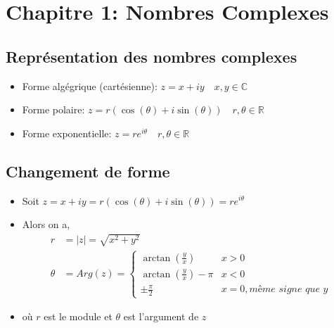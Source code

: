 \section*{Chapitre 1: Nombres Complexes}

\subsection*{Représentation des nombres complexes}
\begin{itemize}[itemsep = 0.5em]
    \item[] Forme algégrique (cartésienne): \begin{math}z = x + iy \quad x,y \in \mathbb{C} \end{math}
    \item[] Forme polaire: $z = r(\cos(\theta)+i\sin(\theta)) \quad r, \theta \in \mathbb{R}$
    \item[] Forme exponentielle: \(z = re^{i\theta} \quad r, \theta \in \mathbb{R} \)
  \end{itemize}


\subsection*{Changement de forme}
\begin{itemize}
    \item[] Soit $z = x + iy = r(\cos(\theta)+i\sin(\theta)) = re^{i\theta}$
    \item[] Alors on a,
    \begin{align*}
    r &= |z| = \sqrt{x^2 + y^2} \\
    \theta &= Arg(z) =
    \begin{cases} 
        \arctan(\frac{y}{x}) & x > 0 \\
        \arctan(\frac{y}{x}) - \pi & x < 0 \\
        \pm\frac{\pi}{2} & x = 0, \textit{même signe que y}
    \end{cases}
    \end{align*}
    \item[] où $r$ est le module et $\theta$ est l'argument de $z$ 
\end{itemize}


